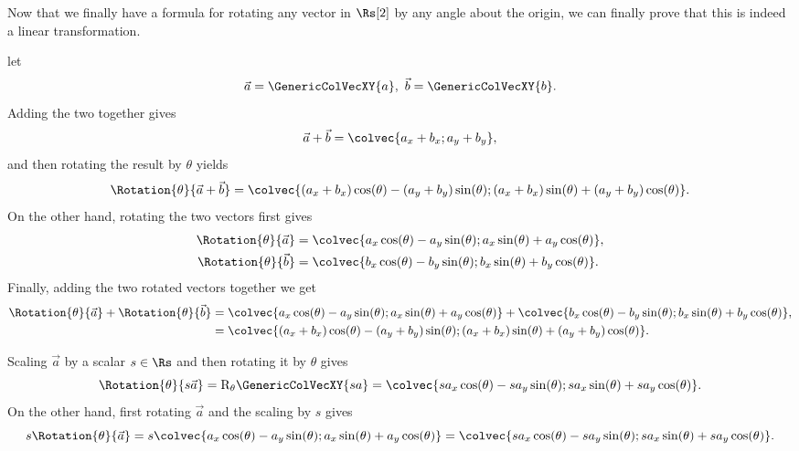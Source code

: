 Now that we finally have a formula for rotating any vector in $\Rs[2]$ by any angle about the origin, we can finally prove that this is indeed a linear transformation.
\begin{descitemize}
	\item[Additivity] let
		\begin{equation*}
			\vec{a}=\GenericColVecXY{a},\ \vec{b}=\GenericColVecXY{b}.
		\end{equation*}
		Adding the two together gives
		\begin{equation*}
			\vec{a}+\vec{b} = \colvec{a_{x}+b_{x};a_{y}+b_{y}},
		\end{equation*}
		and then rotating the result by $\theta$ yields
		\begin{equation*}
			\Rotation{\theta}{\vec{a}+\vec{b}} = \colvec{\left(a_{x}+b_{x}\right)\cos(\theta)-\left(a_{y}+b_{y}\right)\sin(\theta);\left(a_{x}+b_{x}\right)\sin(\theta)+\left(a_{y}+b_{y}\right)\cos(\theta)}.
		\end{equation*}
		On the other hand, rotating the two vectors first gives
		\begin{align*}
			\Rotation{\theta}{\vec{a}} &= \colvec{a_{x}\cos(\theta)-a_{y}\sin(\theta);a_{x}\sin(\theta)+a_{y}\cos(\theta)},\\ 
			\Rotation{\theta}{\vec{b}} &= \colvec{b_{x}\cos(\theta)-b_{y}\sin(\theta);b_{x}\sin(\theta)+b_{y}\cos(\theta)}.
		\end{align*}
		Finally, adding the two rotated vectors together we get
		\begin{align*}
			\Rotation{\theta}{\vec{a}} + \Rotation{\theta}{\vec{b}} &= \colvec{a_{x}\cos(\theta)-a_{y}\sin(\theta);a_{x}\sin(\theta)+a_{y}\cos(\theta)} + \colvec{b_{x}\cos(\theta)-b_{y}\sin(\theta);b_{x}\sin(\theta)+b_{y}\cos(\theta)},\\
																	&= \colvec{\left(a_{x}+b_{x}\right)\cos(\theta)-\left(a_{y}+b_{y}\right)\sin(\theta);\left(a_{x}+b_{x}\right)\sin(\theta)+\left(a_{y}+b_{y}\right)\cos(\theta)}.
		\end{align*}

	\item[Homogeneity] Scaling $\vec{a}$ by a scalar $s\in\Rs$ and then rotating it by $\theta$ gives
		\begin{equation*}
			\Rotation{\theta}{s\vec{a}} = \text{R}_{\theta}\GenericColVecXY{sa} = \colvec{s a_{x}\cos(\theta)-s a_{y}\sin(\theta);s a_{x}\sin(\theta)+s a_{y}\cos(\theta)}.
		\end{equation*}
		On the other hand, first rotating $\vec{a}$ and the scaling by $s$ gives
		\begin{equation*}
			s\Rotation{\theta}{\vec{a}} = s\colvec{a_{x}\cos(\theta)-a_{y}\sin(\theta);a_{x}\sin(\theta)+a_{y}\cos(\theta)} = \colvec{s a_{x}\cos(\theta)-s a_{y}\sin(\theta);s a_{x}\sin(\theta)+s a_{y}\cos(\theta)}.
		\end{equation*}
\end{descitemize}

